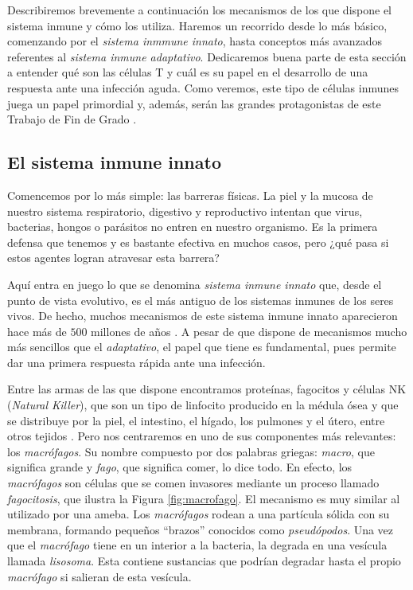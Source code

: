 Describiremos brevemente a continuación los mecanismos de los que dispone el sistema inmune y cómo los utiliza. Haremos un recorrido desde lo más básico, comenzando por el \textit{sistema inmmune innato}, hasta conceptos más avanzados referentes al \textit{sistema inmune adaptativo}. Dedicaremos buena parte de esta sección a entender qué son las células T y cuál es su papel en el desarrollo de una respuesta ante una infección aguda. Como veremos, este tipo de células inmunes juega un papel primordial y, además, serán las grandes protagonistas de este Trabajo de Fin de Grado \citep{JTB}.  

\subsection{El sistema inmune innato}
\label{sub:sistInmInnato}

Comencemos por lo más simple: las barreras físicas. La piel y la mucosa de nuestro sistema respiratorio, digestivo y reproductivo intentan que virus, bacterias, hongos o parásitos no entren en nuestro organismo. Es la primera defensa que tenemos y es bastante efectiva en muchos casos, pero ¿qué pasa si estos agentes logran atravesar esta barrera?

Aquí entra en juego lo que se denomina \textit{sistema inmune innato} que, desde el punto de vista evolutivo, es el más antiguo de los sistemas inmunes de los seres vivos. De hecho, muchos mecanismos de este sistema inmune innato aparecieron hace más de $500$ millones de años \citep{theHowItWorks}. A pesar de que dispone de mecanismos mucho más sencillos que el \textit{adaptativo}, el papel que tiene es fundamental, pues permite dar una primera respuesta rápida ante una infección. 

Entre las armas de las que dispone encontramos proteínas, fagocitos y células NK (\textit{Natural Killer}), que son un tipo de linfocito producido en la médula ósea y que se distribuye por la piel, el intestino, el hígado, los pulmones y el útero, entre otros tejidos \citep{celulasNK}. Pero nos centraremos en uno de sus componentes más relevantes: los \textit{macrófagos}. Su nombre compuesto por dos palabras griegas: \textit{macro}, que significa grande y \textit{fago}, que significa comer, lo dice todo. En efecto, los \textit{macrófagos} son células que se comen invasores mediante un proceso llamado \textit{fagocitosis}, que ilustra la Figura \ref{fig:macrofago}. El mecanismo es muy similar al utilizado por una ameba. Los \textit{macrófagos} rodean a una partícula sólida con su membrana, formando pequeños ``brazos'' conocidos como \textit{pseudópodos}. Una vez que el \textit{macrófago} tiene en un interior a la bacteria, la degrada en una vesícula llamada \textit{lisosoma}. Esta contiene sustancias que podrían degradar hasta el propio \textit{macrófago} si salieran de esta vesícula. 


